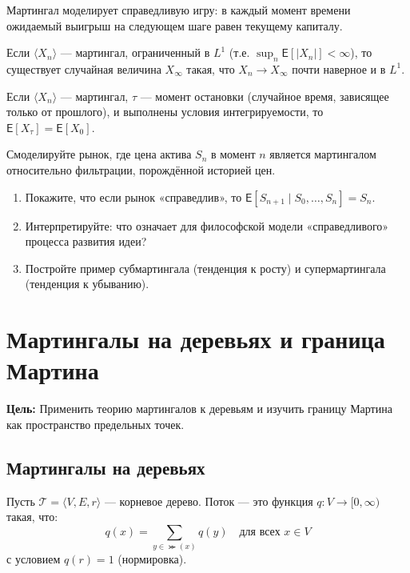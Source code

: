 \documentclass[11pt, a4paper]{extarticle}
\newcommand{\Tcal}{{\mathcal T}}
\newcommand{\E}{{\mathsf E}}
\begin{document}
\begin{theorem}
Мартингал моделирует справедливую игру: в каждый момент времени ожидаемый выигрыш на следующем шаге равен текущему капиталу.
\end{theorem}

\begin{theorem}
Если $\langle X_n \rangle$ --- мартингал, ограниченный в $L^1$ (т.е. $\sup_n \E[|X_n|] < \infty$), то существует случайная величина $X_\infty$ такая, что $X_n \to X_\infty$ почти наверное и в $L^1$.
\end{theorem}

\begin{theorem}
Если $\langle X_n \rangle$ --- мартингал, $\tau$ --- момент остановки (случайное время, зависящее только от прошлого), и выполнены условия интегрируемости, то $\E[X_\tau] = \E[X_0]$.
\end{theorem}

\begin{exercise}
Смоделируйте рынок, где цена актива $S_n$ в момент $n$ является мартингалом относительно фильтрации, порождённой историей цен.
\begin{enumerate}
    \item Покажите, что если рынок «справедлив», то $\E[S_{n+1} \mid S_0, \ldots, S_n] = S_n$.
    \item Интерпретируйте: что означает для философской модели «справедливого» процесса развития идеи?
    \item Постройте пример субмартингала (тенденция к росту) и супермартингала (тенденция к убыванию).
\end{enumerate}
\end{exercise}

\section{Мартингалы на деревьях и граница Мартина}
\textbf{Цель:} Применить теорию мартингалов к деревьям и изучить границу Мартина как пространство предельных точек.

\subsection{Мартингалы на деревьях}

\begin{definition}
Пусть $\Tcal = \langle V, E, r \rangle$ --- корневое дерево. Поток --- это функция $q: V \to [0, \infty)$ такая, что:
$$q(x) = \sum_{y \in \Succ(x)} q(y) \quad \text{для всех } x \in V$$
с условием $q(r) = 1$ (нормировка).
\end{definition}
\end{document}
